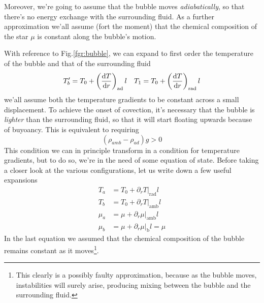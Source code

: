 \par Moreover, we're going to assume that the bubble moves \emph{adiabatically}, so that there's no energy exchange with the surrounding fluid. As a further approximation we'all assume (fort the moment) that the chemical composition of the star $\mu$ is constant along the bubble's motion.
\par With reference to Fig.\ref{fgr:bubble}, we can expand to first order the temperature of the bubble and that of the surrounding fluid
\begin{equation*}
	T_{b}' = T_{0} +\left(\frac{\text{d}T}{\text{d}r}\right)_{\text{ad}}l \quad T_{1} = T_{0} +\left(\frac{\text{d}T}{\text{d}r}\right)_{\text{rad}}l
\end{equation*}
we'all assume both the temperature gradients to be constant across a small displacement. To achieve the onset of covection, it's necessary that the bubble is \emph{lighter} than the surrounding fluid, so that it will start floating upwards because of buyoancy. This is equivalent to requiring
\begin{equation*}
	(\rho_{amb}-\rho_{ad})g > 0
\end{equation*}
This condition we can in principle transform in a condition for temperature gradients, but to do so, we're in the need of some equation of state. Before taking a closer look at the various configurations, let us write down a few useful expansions
\begin{align*}
	T_{a} &= T_{0} + \partial_{r}T|_{\text{rad}}l \\
	T_{b} &= T_{0} + \partial_{r}T|_{\text{amb}}l \\
	\mu_{a} &= \mu + \partial_{r}\mu|_{\text{amb}}l \\
	\mu_{b} &= \mu + \partial_{r}\mu|_{\text{b}}l = \mu
\end{align*}
In the last equation we assumed that the chemical composition of the bubble remains constant as it moves\footnote{This clearly is a possibly faulty approximation, because as the bubble moves, instabilities will surely arise, producing mixing between the bubble and the surrounding fluid.}.
